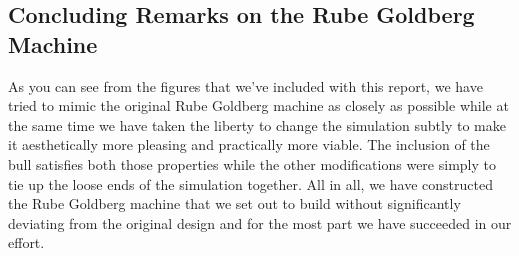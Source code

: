 \documentclass[11pt] {article}
\begin{document}
\subsection {Concluding Remarks on the Rube Goldberg Machine}

As you can see from the figures that we've included with this report, we have tried to mimic the original Rube
Goldberg machine as closely as possible while at the same time we have taken the liberty to change the
simulation subtly to make it aesthetically more pleasing and practically more viable. The inclusion of the
bull satisfies both those properties while the other modifications were simply to tie up the loose ends of 
the simulation together. All in all, we have constructed the Rube Goldberg machine that we set out to build
without significantly deviating from the original design and for the most part we have succeeded in our effort.
 
\end{document}
